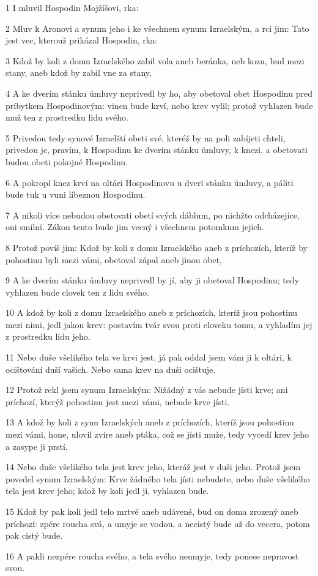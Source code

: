 \par 1 I mluvil Hospodin Mojžíšovi, rka:
\par 2 Mluv k Aronovi a synum jeho i ke všechnem synum Izraelským, a rci jim: Tato jest vec, kterouž prikázal Hospodin, rka:
\par 3 Kdož by koli z domu Izraelského zabil vola aneb beránka, neb kozu, bud mezi stany, aneb kdož by zabil vne za stany,
\par 4 A ke dverím stánku úmluvy neprivedl by ho, aby obetoval obet Hospodinu pred príbytkem Hospodinovým: vinen bude krví, nebo krev vylil; protož vyhlazen bude muž ten z prostredku lidu svého.
\par 5 Privedou tedy synové Izraelští obeti své, kteréž by na poli zabíjeti chteli, privedou je, pravím, k Hospodinu ke dverím stánku úmluvy, k knezi, a obetovati budou obeti pokojné Hospodinu.
\par 6 A pokropí knez krví na oltári Hospodinovu u dverí stánku úmluvy, a páliti bude tuk u vuni líbeznou Hospodinu.
\par 7 A nikoli více nebudou obetovati obetí svých dáblum, po nichžto odcházejíce, oni smilní. Zákon tento bude jim vecný i všechnem potomkum jejich.
\par 8 Protož povíš jim: Kdož by koli z domu Izraelského aneb z príchozích, kteríž by pohostinu byli mezi vámi, obetoval zápal aneb jinou obet,
\par 9 A ke dverím stánku úmluvy neprivedl by jí, aby ji obetoval Hospodinu; tedy vyhlazen bude clovek ten z lidu svého.
\par 10 A kdož by koli z domu Izraelského aneb z príchozích, kteríž jsou pohostinu mezi nimi, jedl jakou krev: postavím tvár svou proti cloveku tomu, a vyhladím jej z prostredku lidu jeho.
\par 11 Nebo duše všelikého tela ve krvi jest, já pak oddal jsem vám ji k oltári, k ocištování duší vašich. Nebo sama krev na duši ocištuje.
\par 12 Protož rekl jsem synum Izraelským: Nižádný z vás nebude jísti krve; ani príchozí, kterýž pohostinu jest mezi vámi, nebude krve jísti.
\par 13 A kdož by koli z synu Izraelských aneb z príchozích, kteríž jsou pohostinu mezi vámi, hone, ulovil zvíre aneb ptáka, což se jísti muže, tedy vycedí krev jeho a zasype ji prstí.
\par 14 Nebo duše všelikého tela jest krev jeho, kteráž jest v duši jeho. Protož jsem povedel synum Izraelským: Krve žádného tela jísti nebudete, nebo duše všelikého tela jest krev jeho; kdož by koli jedl ji, vyhlazen bude.
\par 15 Kdož by pak koli jedl telo mrtvé aneb udávené, bud on doma zrozený aneb príchozí: zpére roucha svá, a umyje se vodou, a necistý bude až do vecera, potom pak cistý bude.
\par 16 A pakli nezpére roucha svého, a tela svého neumyje, tedy ponese nepravost svou.

